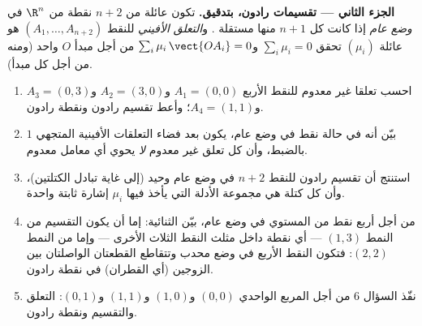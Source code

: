 \begin{problem}
\medskip
\noindent\textbf{الجزء الثاني --- تقسيمات رادون، بتدقيق.} تكون
عائلة من $n + 2$ نقطة من $\R^n$ في \emph{وضع عام} إذا كانت كل
$n + 1$ منها مستقلة . و\emph{التعلق الأفيني} للنقط $(A_1, \dots, A_{n+2})$ هو
عائلة $(\mu_i)$ تحقق $\sum_i \mu_i = 0$ و$\sum_i
\mu_i\,\vect{OA_i} = 0$ من أجل مبدأ $O$ واحد (ومنه
من أجل كل مبدأ).
\begin{enumerate}[resume]
  \item احسب تعلقا  غير معدوم للنقط الأربع $A_1 = (0,0)$ و$A_2 = (3,0)$
        و$A_3 = (0,3)$ و$A_4 = (1,1)$؛ وأعط تقسيم رادون ونقطة رادون.
  \item بيّن أنه في حالة نقط في وضع عام، يكون بعد فضاء التعلقات
        الأفينية المتجهي $1$ بالضبط، وأن كل تعلق غير معدوم
        \emph{لا} يحوي أي معامل معدوم.
  \item استنتج أن تقسيم رادون للنقط $n + 2$ في وضع عام وحيد (إلى
        غاية تبادل الكتلتين)، وأن كل كتلة هي مجموعة الأدلة التي
        يأخذ فيها $\mu_i$ إشارة ثابتة واحدة.
  \item من أجل أربع نقط من المستوي في وضع عام، بيّن الثنائية: إما
        أن يكون التقسيم من النمط $(1, 3)$ --- أي نقطة داخل مثلث النقط
        الثلاث الأخرى --- وإما من النمط $(2, 2)$: فتكون النقط الأربع
        في وضع محدب وتتقاطع القطعتان الواصلتان بين الزوجين (أي
        القطران) في نقطة رادون.
  \item نفّذ السؤال 6 من أجل المربع الواحدي $(0,0)$ و$(1,0)$ و$(1,1)$
        و$(0,1)$: التعلق والتقسيم ونقطة رادون.
\end{enumerate}


\end{problem}
